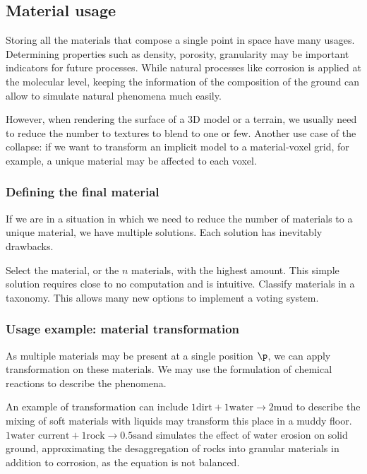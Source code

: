 \subsection{Material usage}
Storing all the materials that compose a single point in space have many usages. Determining properties such as density, porosity, granularity may be important indicators for future processes. While natural processes like corrosion is applied at the molecular level, keeping the information of the composition of the ground can allow to simulate natural phenomena much easily.

However, when rendering the surface of a 3D model or a terrain, we usually need to reduce the number to textures to blend to one or few. Another use case of the collapse: if we want to transform an implicit model to a material-voxel grid, for example, a unique material may be affected to each voxel.

\subsubsection{Defining the final material}
If we are in a situation in which we need to reduce the number of materials to a unique material, we have multiple solutions. Each solution has inevitably drawbacks.
\begin{Itemize}
    \Item{} Select the material, or the $n$ materials, with the highest amount. This simple solution requires close to no computation and is intuitive.
    \Item{} Classify materials in a taxonomy. This allows many new options to implement a voting system.
\end{Itemize}

\subsubsection{Usage example: material transformation}
As multiple materials may be present at a single position $\p$, we can apply transformation on these materials. We may use the formulation of chemical reactions to describe the phenomena.

An example of transformation can include $1 \text{dirt} + 1 \text{water} \to 2 \text{mud}$ to describe the mixing of soft materials with liquids may transform this place in a muddy floor. $1 \text{water current} + 1 \text{rock} \to 0.5 \text{sand}$ simulates the effect of water erosion on solid ground, approximating the desaggregation of rocks into granular materials in addition to corrosion, as the equation is not balanced. 

